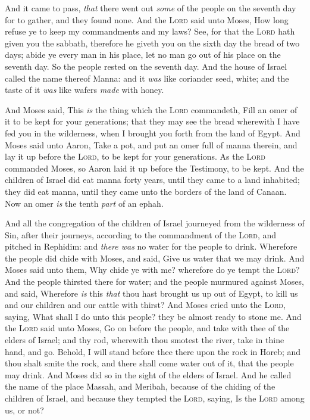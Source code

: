 \documentclass[11pt,letterpaper,oneside]{memoir}
\begin{document}
And it came to pass, \emph{that} there went out \emph{some} of the
people on the seventh day for to gather, and they found none. And the
\textsc{Lord} said unto Moses, How long refuse ye to keep my
commandments and my laws? See, for that the \textsc{Lord} hath given you
the sabbath, therefore he giveth you on the sixth day the bread of two
days; abide ye every man in his place, let no man go out of his place on
the seventh day. So the people rested on the seventh day. And the house
of Israel called the name thereof Manna: and it \emph{was} like
coriander seed, white; and the taste of it \emph{was} like wafers
\emph{made} with honey.

And Moses said, This \emph{is} the thing which the \textsc{Lord}
commandeth, Fill an omer of it to be kept for your generations; that
they may see the bread wherewith I have fed you in the wilderness, when
I brought you forth from the land of Egypt. And Moses said unto Aaron,
Take a pot, and put an omer full of manna therein, and lay it up before
the \textsc{Lord}, to be kept for your generations. As the \textsc{Lord}
commanded Moses, so Aaron laid it up before the Testimony, to be kept.
And the children of Israel did eat manna forty years, until they came to
a land inhabited; they did eat manna, until they came unto the borders
of the land of Canaan. Now an omer \emph{is} the tenth \emph{part} of an
ephah.

And all the congregation of the children of Israel journeyed from the
wilderness of Sin, after their journeys, according to the commandment of
the \textsc{Lord}, and pitched in Rephidim: and \emph{there was} no
water for the people to drink. Wherefore the people did chide with
Moses, and said, Give us water that we may drink. And Moses said unto
them, Why chide ye with me? wherefore do ye tempt the \textsc{Lord}? And
the people thirsted there for water; and the people murmured against
Moses, and said, Wherefore \emph{is} this \emph{that} thou hast brought
us up out of Egypt, to kill us and our children and our cattle with
thirst? And Moses cried unto the \textsc{Lord}, saying, What shall I do
unto this people? they be almost ready to stone me. And the
\textsc{Lord} said unto Moses, Go on before the people, and take with
thee of the elders of Israel; and thy rod, wherewith thou smotest the
river, take in thine hand, and go. Behold, I will stand before thee
there upon the rock in Horeb; and thou shalt smite the rock, and there
shall come water out of it, that the people may drink. And Moses did so
in the sight of the elders of Israel. And he called the name of the
place Massah, and Meribah, because of the chiding of the children of
Israel, and because they tempted the \textsc{Lord}, saying, Is the
\textsc{Lord} among us, or not?
\end{document}
